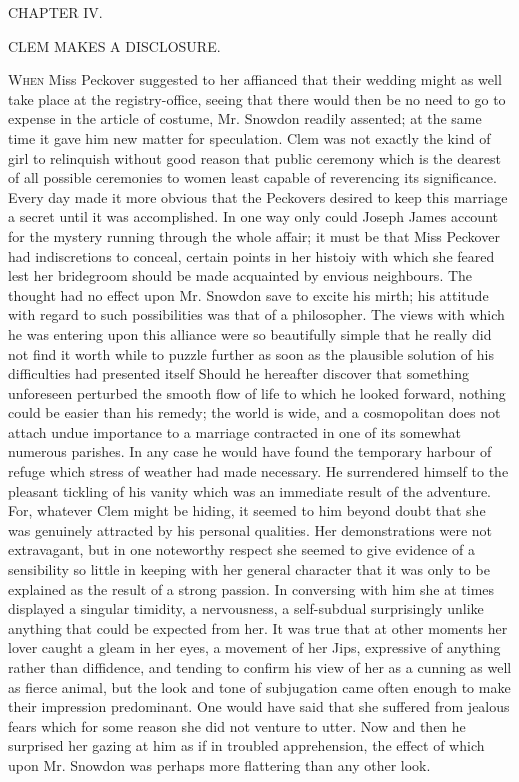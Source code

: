 {}

{CHAPTER IV.}

CLEM MAKES A DISCLOSURE.

\textsc{When} Miss Peckover suggested to her affianced that their
wedding might as well take place at the registry-office, seeing that
there would then be no need to go to expense in the article of costume,
Mr. Snowdon readily assented; at the same time it gave him new matter
for speculation. Clem was not exactly the kind of girl to relinquish
without good reason that public ceremony which is the dearest of all
possible ceremonies to women least capable of reverencing its
significance. Every day made it more obvious that the Peckovers desired
to keep this marriage a secret until it was accomplished. In one way
only could Joseph James account for the mystery running through the
whole affair; it must be {}that Miss Peckover had indiscretions to
conceal, certain points in her histoiy with which she feared lest her
bridegroom should be made acquainted by envious neighbours. The thought
had no effect upon Mr. Snowdon save to excite his mirth; his attitude
with regard to such possibilities was that of a philosopher. The views
with which he was entering upon this alliance were so beautifully simple
that he really did not find it worth while to puzzle further as soon as
the plausible solution of his difficulties had presented itself Should
he hereafter discover that something unforeseen perturbed the smooth
flow of life to which he looked forward, nothing could be easier than
his remedy; the world is wide, and a cosmopolitan does not attach undue
importance to a marriage contracted in one of its somewhat numerous
parishes. In any case he would have found the temporary harbour of
refuge which stress of weather had made necessary. He surrendered
himself to the pleasant tickling of his vanity which was an immediate
result of the adventure. For, {}whatever Clem might be hiding, it seemed
to him beyond doubt that she was genuinely attracted by his personal
qualities. Her demonstrations were not extravagant, but in one
noteworthy respect she seemed to give evidence of a sensibility so
little in keeping with her general character that it was only to be
explained as the result of a strong passion. In conversing with him she
at times displayed a singular timidity, a nervousness, a self-subdual
surprisingly unlike anything that could be expected from her. It was
true that at other moments her lover caught a gleam in her eyes, a
movement of her Jips, expressive of anything rather than diffidence, and
tending to confirm his view of her as a cunning as well as fierce
animal, but the look and tone of subjugation came often enough to make
their impression predominant. One would have said that she suffered from
jealous fears which for some reason she did not venture to utter. Now
and then he surprised her gazing at him as if in troubled apprehension,
the effect of which {}upon Mr. Snowdon was perhaps more flattering than
any other look.

